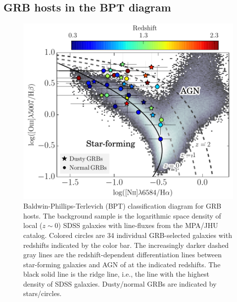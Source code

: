 \documentclass[traditabstract, longauth]{aa}
\begin{document}
\subsection{GRB hosts in the BPT diagram}

\begin{figure}
\includegraphics[angle=0, width=0.99\columnwidth]{Figs/BPT.pdf}
\caption{Baldwin-Phillips-Terlevich (BPT) classification diagram for GRB hosts. The background sample is the logarithmic space density of local ($z\sim0$) SDSS galaxies with line-fluxes from the MPA/JHU catalog\footnotemark. Colored circles are 34 individual GRB-selected galaxies with redshifts indicated by the color bar. The increasingly darker dashed gray lines are the redshift-dependent differentiation lines between star-forming galaxies and AGN of \citet{2013ApJ...774L..10K} at the indicated redshifts. The black solid line is the ridge line, i.e., the line with the highest density of SDSS galaxies. Dusty/normal GRBs are indicated by stars/circles.}
\label{fig:bpt}
\end{figure}
\end{document}
